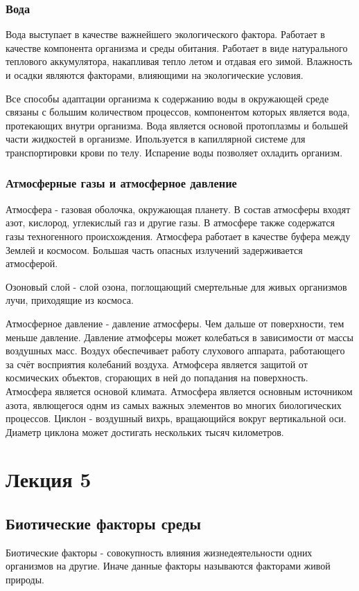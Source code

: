 \subsection{Вода}
Вода выступает в качестве важнейшего экологического фактора. Работает в качестве компонента организма и среды обитания. Работает в виде натурального теплового аккумулятора, накапливая тепло летом и отдавая его зимой. Влажность и осадки являются факторами, влияющими на экологические условия. 

Все способы адаптации организма к содержанию воды в окружающей среде связаны с большим количеством процессов, компонентом которых является вода, протекающих внутри организма. Вода является основой протоплазмы и большей части жидкостей в организме. Ипользуется в капиллярной системе для транспортировки крови по телу. Испарение воды позволяет охладить организм. 

\subsection{Атмосферные газы и атмосферное давление}

Атмосфера - газовая оболочка, окружающая планету. В состав атмосферы входят азот, кислород, углекислый газ и другие газы. В атмосфере также содержатся газы техногенного происхождения. Атмосфера работает в качестве буфера между Землей и космосом. Большая часть опасных излучений задерживается атмосферой. 

Озоновый слой - слой озона, поглощающий смертельные для живых организмов лучи, приходящие из космоса.

Атмосферное давление - давление атмосферы. Чем дальше от поверхности, тем меньше давление. Давление атмофсеры может колебаться в зависимости от массы воздушных масс. Воздух обеспечивает работу слухового аппарата, работающего за счёт восприятия колебаний воздуха. Атмофсера является защитой от космических объектов, сгорающих в ней до попадания на поверхность. Атмосфера является основой климата. Атмосфера является основным источником азота, явлющегося однм из самых важных элементов во многих биологических процессов. Циклон - воздушный вихрь, вращающийся вокруг вертикальной оси. Диаметр циклона может достигать нескольких тысяч километров.

\chapter{Лекция 5}
\section{Биотические факторы среды}
Биотические факторы - совокупность влияния жизнедеятельности одних организмов на другие. Иначе данные факторы называются факторами живой природы.

